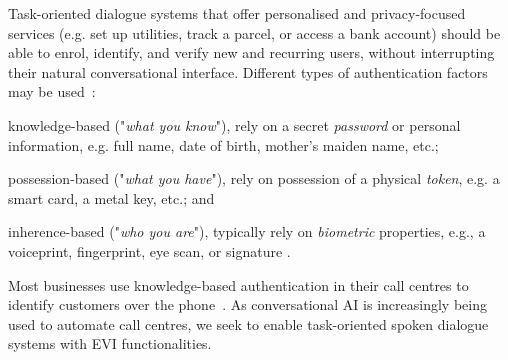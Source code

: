 \documentclass[11pt]{article}
\begin{document}
Task-oriented dialogue systems
that offer personalised and privacy-focused services (e.g. set up utilities, track a parcel, or access a bank account) should be able to enrol, identify, and verify new and recurring users, without interrupting their natural conversational interface.
Different types of authentication factors may be used~\cite{smith2001authentication,o2003comparing}:
\begin{enumerate*}[label=\roman*)]\item knowledge-based ("\textit{what you know}"),
  rely on a secret \textit{password} or personal information,
  e.g. full name, date of birth, mother's maiden name, etc.;
  \item possession-based ("\textit{what you have}"),
  rely on possession of a physical \textit{token},
  e.g. a smart card, a metal key, etc.; and
  \item inherence-based ("\textit{who you are}"),
  typically rely on \textit{biometric} properties,
  e.g., a voiceprint, fingerprint, eye scan, or signature \cite{variani2014deep}.
\end{enumerate*}
Most businesses use knowledge-based authentication in their call centres to identify customers over the phone~\cite{hrabi2020call,amein2020hidden,morgen2012voice,petersen2019complexity}. As conversational AI is increasingly being used to automate call centres,
we seek to enable task-oriented spoken dialogue systems with EVI functionalities.
\end{document}
